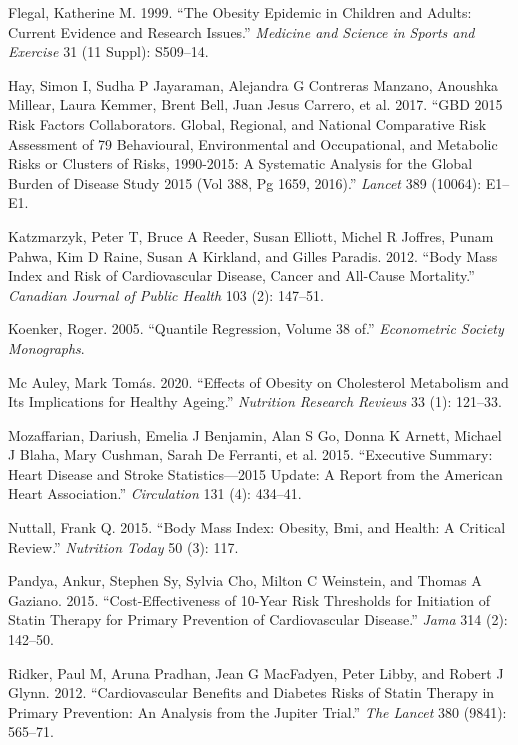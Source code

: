\documentclass[
  12pt,
]{article}
\begin{document}
\leavevmode\hypertarget{ref-flegal1999}{}%
Flegal, Katherine M. 1999. ``The Obesity Epidemic in Children and Adults: Current Evidence and Research Issues.'' \emph{Medicine and Science in Sports and Exercise} 31 (11 Suppl): S509--14.

\leavevmode\hypertarget{ref-hay2017gbd}{}%
Hay, Simon I, Sudha P Jayaraman, Alejandra G Contreras Manzano, Anoushka Millear, Laura Kemmer, Brent Bell, Juan Jesus Carrero, et al. 2017. ``GBD 2015 Risk Factors Collaborators. Global, Regional, and National Comparative Risk Assessment of 79 Behavioural, Environmental and Occupational, and Metabolic Risks or Clusters of Risks, 1990-2015: A Systematic Analysis for the Global Burden of Disease Study 2015 (Vol 388, Pg 1659, 2016).'' \emph{Lancet} 389 (10064): E1--E1.

\leavevmode\hypertarget{ref-katbody}{}%
Katzmarzyk, Peter T, Bruce A Reeder, Susan Elliott, Michel R Joffres, Punam Pahwa, Kim D Raine, Susan A Kirkland, and Gilles Paradis. 2012. ``Body Mass Index and Risk of Cardiovascular Disease, Cancer and All-Cause Mortality.'' \emph{Canadian Journal of Public Health} 103 (2): 147--51.

\leavevmode\hypertarget{ref-koenker2005}{}%
Koenker, Roger. 2005. ``Quantile Regression, Volume 38 of.'' \emph{Econometric Society Monographs}.

\leavevmode\hypertarget{ref-mc2020effects}{}%
Mc Auley, Mark Tomás. 2020. ``Effects of Obesity on Cholesterol Metabolism and Its Implications for Healthy Ageing.'' \emph{Nutrition Research Reviews} 33 (1): 121--33.

\leavevmode\hypertarget{ref-mozaffarian2015executive}{}%
Mozaffarian, Dariush, Emelia J Benjamin, Alan S Go, Donna K Arnett, Michael J Blaha, Mary Cushman, Sarah De Ferranti, et al. 2015. ``Executive Summary: Heart Disease and Stroke Statistics---2015 Update: A Report from the American Heart Association.'' \emph{Circulation} 131 (4): 434--41.

\leavevmode\hypertarget{ref-nuttall2015body}{}%
Nuttall, Frank Q. 2015. ``Body Mass Index: Obesity, Bmi, and Health: A Critical Review.'' \emph{Nutrition Today} 50 (3): 117.

\leavevmode\hypertarget{ref-pandya2015}{}%
Pandya, Ankur, Stephen Sy, Sylvia Cho, Milton C Weinstein, and Thomas A Gaziano. 2015. ``Cost-Effectiveness of 10-Year Risk Thresholds for Initiation of Statin Therapy for Primary Prevention of Cardiovascular Disease.'' \emph{Jama} 314 (2): 142--50.

\leavevmode\hypertarget{ref-ridker2012}{}%
Ridker, Paul M, Aruna Pradhan, Jean G MacFadyen, Peter Libby, and Robert J Glynn. 2012. ``Cardiovascular Benefits and Diabetes Risks of Statin Therapy in Primary Prevention: An Analysis from the Jupiter Trial.'' \emph{The Lancet} 380 (9841): 565--71.
\end{document}
